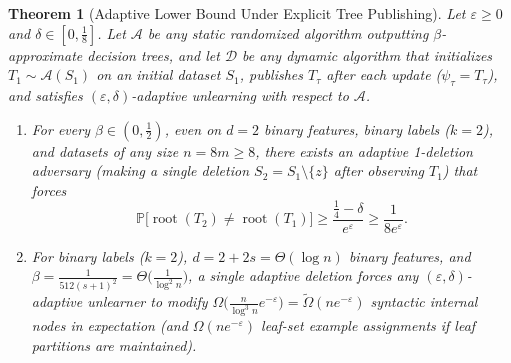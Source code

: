 \documentclass[11pt]{article}
\newtheorem{theorem}{Theorem}
\theoremstyle{definition}
\newcommand{\Prob}{\mathbb{P}}
\newcommand{\calA}{\mathcal{A}}
\newcommand{\calD}{\mathcal{D}}
\begin{document}
\begin{theorem}[Adaptive Lower Bound Under Explicit Tree Publishing]
\label{thm:lower}
Let $\varepsilon \ge 0$ and $\delta \in [0, \frac{1}{8}]$. Let $\calA$ be any static randomized algorithm outputting $\beta$-approximate decision trees, and let $\calD$ be any dynamic algorithm that initializes $T_1 \sim \calA(S_1)$ on an initial dataset $S_1$, publishes $T_\tau$ after each update ($\psi_\tau = T_\tau$), and satisfies $(\varepsilon, \delta)$-adaptive unlearning with respect to $\calA$.
\begin{enumerate}[label=(\alph*),leftmargin=1.8em,itemsep=2pt]
    \item For every $\beta \in (0, \frac{1}{2})$, even on $d = 2$ binary features, binary labels ($k = 2$), and datasets of any size $n = 8m \ge 8$, there exists an adaptive 1-deletion adversary (making a single deletion $S_2 = S_1 \setminus \{z\}$ after observing $T_1$) that forces
    \[
        \Prob\big[\operatorname{root}(T_2) \ne \operatorname{root}(T_1)\big] \ge \frac{\frac{1}{4} - \delta}{e^\varepsilon} \ge \frac{1}{8 e^\varepsilon}.
    \]
    \item For binary labels ($k = 2$), $d = 2 + 2s = \Theta(\log n)$ binary features, and $\beta = \frac{1}{512(s+1)^2} = \Theta\big(\frac{1}{\log^2 n}\big)$, a single adaptive deletion forces any $(\varepsilon, \delta)$-adaptive unlearner to modify $\Omega\big(\frac{n}{\log^3 n} e^{-\varepsilon}\big) = \tilde{\Omega}(n e^{-\varepsilon})$ syntactic internal nodes in expectation (and $\Omega(n e^{-\varepsilon})$ leaf-set example assignments if leaf partitions are maintained).
\end{enumerate}
\end{theorem}
\end{document}
